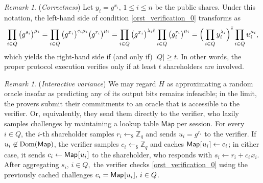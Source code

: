 \documentclass[10pt, psamsfonts, reqno]{amsart}
\theoremstyle{definition}
\theoremstyle{remark}
\newtheorem{rem}[thm]{Remark}
\numberwithin{equation}{section}
\begin{document}
\begin{rem}\label{orst_correctness}
(\textit{Correctness})
Let $y_i = g ^ {x_i},\hspace{2pt} 1 \le i \le n$
be the public shares.
Under this notation,
the left-hand side of condition \eqref{orst_verification_0}
transforms as
\vspace{5pt}
\begin{equation*}
\prod_{i \in Q} \big(g ^ {s_i }\big) ^ {\mu_i} =
\prod_{i \in Q} \big(g ^ {x_i}\big) ^ {c_i \mu_i} \big(g ^ {r_i}\big) ^ {\mu_i} =
\prod_{i \in Q} \big(g ^ {x_i}\big) ^ {\lambda_i \bar{c}} \prod_{i \in Q} \big(g_i ^ {r_i}\big) ^ {\mu_i} =
\Big(\prod_{i \in Q} y_i ^ {\lambda_i}\Big) ^ {\bar{c}} \prod_{i \in Q} u_i ^ {\mu_i},
\vspace{5pt}
\end{equation*}
which yields the right-hand side if (and only if) $|Q| \ge t$.
In other words, the proper protocol execution verifies
only if at least $t$ shareholders are involved.
\end{rem}

\begin{rem}\label{orst_interactive}
(\textit{Interactive variance})
We may regard $H$ as approximating
a random oracle insofar as predicting any of its output bits
remains infeasible; in the limit,
the provers submit their commitments
to an oracle that is accessible to the verifier.
Or, equivalently, they send them
directly to the verifier, who lazily samples challenges
by maintaining a lookup table $\mathsf{Map}$ per session.
For every $i \in Q$, the $i$-th shareholder
samples $r_i \leftarrow_\$ \mathbb{Z}_q$
and sends
$u_i = g ^ {r_i}$ to the verifier.
If $u_i \not \in \textup{Dom}(\mathsf{Map})$,
the verifier samples
$c_i \leftarrow_\$ \mathbb{Z}_q$
and caches
$\mathsf{Map}\hspace{0.5pt}
[\hspace{0.5pt}u_i\hspace{0.5pt}]\leftarrow c_i$;
in either case, it sends %
$c_i \leftarrow \mathsf{Map}\hspace{0.5pt}
[\hspace{0.5pt}u_i\hspace{0.5pt}]$
to the shareholder, who responds with
$s_i \leftarrow r_i + c_i\hspace{1pt}x_i$.
After aggregating
$s_i,\hspace{2pt} i \in Q,$
the verifier checks
\eqref{orst_verification_0} using
the previously cached challenges
$c_i = \mathsf{Map}\hspace{0.5pt}
[\hspace{0.5pt}u_i\hspace{0.5pt}],\hspace{2pt} i \in Q$.
\end{rem}
\end{document}
